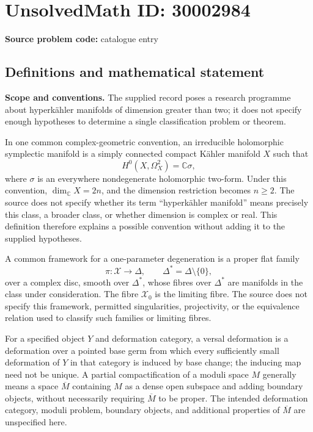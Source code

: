\documentclass[11pt]{article}
\newcommand{\C}{\mathbb{C}}
\begin{document}
\section*{UnsolvedMath ID: 30002984}
\textbf{Source problem code:} catalogue entry
\subsection{Definitions and mathematical statement}
\textbf{Scope and conventions.} The supplied record poses a research programme about hyperkähler manifolds of dimension greater than two; it does not specify enough hypotheses to determine a single classification problem or theorem.

In one common complex-geometric convention, an irreducible holomorphic symplectic manifold is a simply connected compact Kähler manifold \(X\) such that
\[
H^0(X,\Omega_X^2)=\C\sigma,
\]
where \(\sigma\) is an everywhere nondegenerate holomorphic two-form. Under this convention, \(\dim_{\C}X=2n\), and the dimension restriction becomes \(n\geq 2\). The source does not specify whether its term ``hyperkähler manifold'' means precisely this class, a broader class, or whether dimension is complex or real. This definition therefore explains a possible convention without adding it to the supplied hypotheses.

A common framework for a one-parameter degeneration is a proper flat family
\[
\pi:\mathcal X\longrightarrow\Delta,
\qquad \Delta^*=\Delta\setminus\{0\},
\]
over a complex disc, smooth over \(\Delta^*\), whose fibres over \(\Delta^*\) are manifolds in the class under consideration. The fibre \(\mathcal X_0\) is the limiting fibre. The source does not specify this framework, permitted singularities, projectivity, or the equivalence relation used to classify such families or limiting fibres.

For a specified object \(Y\) and deformation category, a versal deformation is a deformation over a pointed base germ from which every sufficiently small deformation of \(Y\) in that category is induced by base change; the inducing map need not be unique. A partial compactification of a moduli space \(M\) generally means a space \(\overline M\) containing \(M\) as a dense open subspace and adding boundary objects, without necessarily requiring \(\overline M\) to be proper. The intended deformation category, moduli problem, boundary objects, and additional properties of \(\overline M\) are unspecified here.
\end{document}
